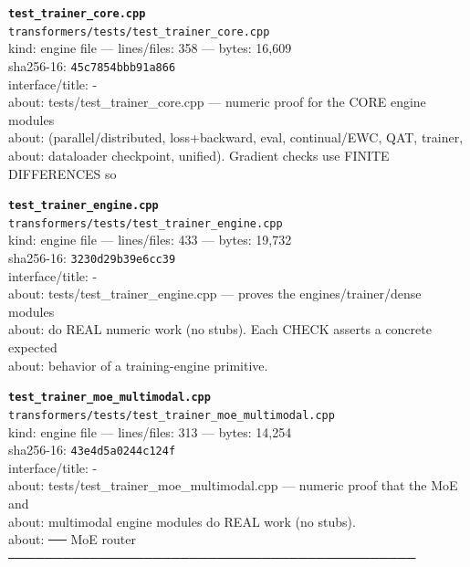 \noindent\textbf{\texttt{test\_trainer\_core.cpp}}\\
\texttt{transformers/tests/test\_trainer\_core.cpp}\\
kind: engine file --- lines/files: 358 --- bytes: 16,609\\
sha256-16: \texttt{45c7854bbb91a866}\\
interface/title: -\\
about: tests/test\_trainer\_core.cpp — numeric proof for the CORE engine modules\\
about: (parallel/distributed, loss+backward, eval, continual/EWC, QAT, trainer,\\
about: dataloader checkpoint, unified). Gradient checks use FINITE DIFFERENCES so\\
\vspace*{6.0pt}

\noindent\textbf{\texttt{test\_trainer\_engine.cpp}}\\
\texttt{transformers/tests/test\_trainer\_engine.cpp}\\
kind: engine file --- lines/files: 433 --- bytes: 19,732\\
sha256-16: \texttt{3230d29b39e6cc39}\\
interface/title: -\\
about: tests/test\_trainer\_engine.cpp — proves the engines/trainer/dense modules\\
about: do REAL numeric work (no stubs). Each CHECK asserts a concrete expected\\
about: behavior of a training-engine primitive.\\
\vspace*{6.0pt}
\newpage

\noindent\textbf{\texttt{test\_trainer\_moe\_multimodal.cpp}}\\
\texttt{transformers/tests/test\_trainer\_moe\_multimodal.cpp}\\
kind: engine file --- lines/files: 313 --- bytes: 14,254\\
sha256-16: \texttt{43e4d5a0244c124f}\\
interface/title: -\\
about: tests/test\_trainer\_moe\_multimodal.cpp — numeric proof that the MoE and\\
about: multimodal engine modules do REAL work (no stubs).\\
about: ── MoE router ─────────────────────────────────────────────\\
\vspace*{6.0pt}

